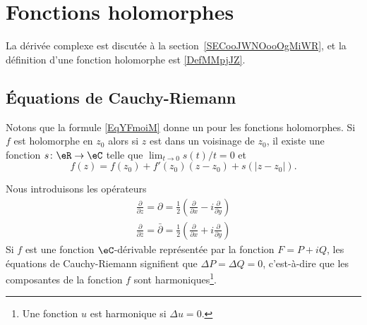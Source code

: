 
\section{Fonctions holomorphes}

La dérivée complexe est discutée à la section~\ref{SECooJWNOooOgMiWR}, et la définition d'une fonction holomorphe est \ref{DefMMpjJZ}.

\subsection{Équations de Cauchy-Riemann}

Notons que la formule \eqref{EqYFmoiM} donne un  pour les fonctions holomorphes. Si \( f\) est holomorphe en \( z_0\) alors si \( z\) est dans un voisinage de \( z_0\), il existe une fonction \( s\colon \eR\to \eC\) telle que \( \lim_{t\to 0} s(t)/t=0\) et
\begin{equation}    \label{EqptwBFG}
	f(z)=f(z_0)+f'(z_0)(z-z_0)+s(| z-z_0 |).
\end{equation}

Nous introduisons les opérateurs
\begin{subequations}
	\begin{align}
		\frac{ \partial  }{ \partial z }=\partial=\frac{ 1 }{2}\left( \frac{ \partial  }{ \partial x }-i\frac{ \partial  }{ \partial y } \right) \\
		\frac{ \partial  }{ \partial \bar z }=\bar\partial=\frac{ 1 }{2}\left( \frac{ \partial  }{ \partial x }+i\frac{ \partial  }{ \partial y } \right)
	\end{align}
\end{subequations}
Si \( f\) est une fonction $\eC$-dérivable représentée par la fonction \( F=P+iQ\), les équations de Cauchy-Riemann signifient que \( \Delta P=\Delta Q=0\), c'est-à-dire que les composantes de la fonction \( f\) sont harmoniques\footnote{Une fonction \( u\) est harmonique si \( \Delta u=0\).}.

